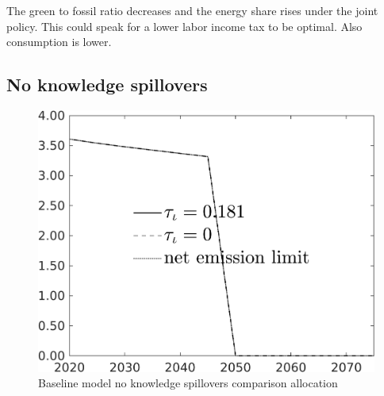 \documentclass[12pt]{article}
\begin{document}
The green to fossil ratio decreases and the energy share rises under the joint policy. This could speak for a lower labor income tax to be optimal. 
Also consumption is lower. 


\clearpage \newpage
\subsection{No knowledge spillovers}
\begin{figure}[h!!]
	\centering
	\caption{Baseline model no knowledge spillovers comparison allocation}\label{fig:Leveltauf_nsk1_xgr0_noknow_notaul}
	\begin{minipage}[]{0.32\textwidth}
		\includegraphics[width=1\textwidth]{../../codding_model/own_basedOnFried/optimalPol_010922_revision/figures/all_13Sept22/CompTauf_bytaul_Reg0_Emnet_spillover0_nsk0_xgr0_knspil1_sep0_LFlimit1_emsbase0_countec0_GovRev0_etaa0.79_lgd1.png}
	\end{minipage}		
	\begin{minipage}[]{0.32\textwidth}

\end{minipage}
\end{figure}
\end{document}

